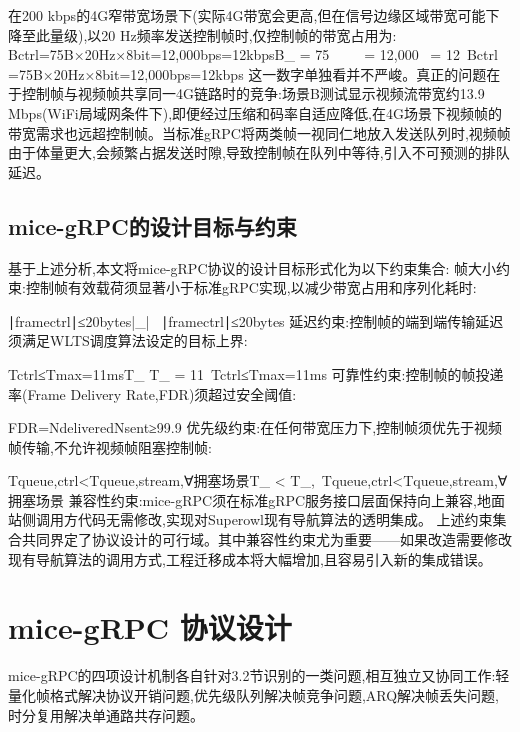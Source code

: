 在200 kbps的4G窄带宽场景下(实际4G带宽会更高,但在信号边缘区域带宽可能下降至此量级),以20 Hz频率发送控制帧时,仅控制帧的带宽占用为:
Bctrl=75B×20Hz×8bit=12,000bps=12kbpsB_{} = 75\  \  \  = 12{,}000\  = 12\ Bctrl​=75B×20Hz×8bit=12,000bps=12kbps
这一数字单独看并不严峻。真正的问题在于控制帧与视频帧共享同一4G链路时的竞争:场景B测试显示视频流带宽约13.9 Mbps(WiFi局域网条件下),即便经过压缩和码率自适应降低,在4G场景下视频帧的带宽需求也远超控制帧。当标准gRPC将两类帧一视同仁地放入发送队列时,视频帧由于体量更大,会频繁占据发送时隙,导致控制帧在队列中等待,引入不可预测的排队延迟。

\subsection{mice-gRPC的设计目标与约束}
基于上述分析,本文将mice-gRPC协议的设计目标形式化为以下约束集合:
帧大小约束:控制帧有效载荷须显著小于标准gRPC实现,以减少带宽占用和序列化耗时:

∣framectrl∣≤20bytes\left|_{}\right| \ ∣framectrl​∣≤20bytes
延迟约束:控制帧的端到端传输延迟须满足WLTS调度算法设定的目标上界:

Tctrl≤Tmax⁡=11msT_{} \leq T_{\max} = 11\ Tctrl​≤Tmax​=11ms
可靠性约束:控制帧的帧投递率(Frame Delivery Rate,FDR)须超过安全阈值:

FDR=NdeliveredNsent≥99.9%
优先级约束:在任何带宽压力下,控制帧须优先于视频帧传输,不允许视频帧阻塞控制帧:

Tqueue,ctrl<Tqueue,stream,∀拥塞场景T_{} < T_{},\ \forall {}Tqueue,ctrl​<Tqueue,stream​,∀拥塞场景
兼容性约束:mice-gRPC须在标准gRPC服务接口层面保持向上兼容,地面站侧调用方代码无需修改,实现对Superowl现有导航算法的透明集成。
上述约束集合共同界定了协议设计的可行域。其中兼容性约束尤为重要——如果改造需要修改现有导航算法的调用方式,工程迁移成本将大幅增加,且容易引入新的集成错误。

\section{mice-gRPC 协议设计}

mice-gRPC的四项设计机制各自针对3.2节识别的一类问题,相互独立又协同工作:轻量化帧格式解决协议开销问题,优先级队列解决帧竞争问题,ARQ解决帧丢失问题,时分复用解决单通路共存问题。

